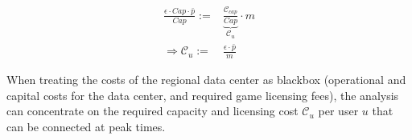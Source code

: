 \begin{align} \label{eq:computational_efficiency}
	\frac{\epsilon \cdot Cap \cdot \bar{p}}{Cap} :=& \underbrace{\frac{\mathcal{C}_{cap}}{Cap}}_{\mathcal{C}_{u}} \cdot m\\
	\Longrightarrow \mathcal{C}_{u} :=& \frac{\epsilon \cdot \bar{p}}{m}
\end{align}

When treating the costs of the regional data center as blackbox (operational and capital costs for the data center, and required game licensing fees), the analysis can concentrate on the required capacity and licensing cost $\mathcal{C}_{u}$ per user $u$ that can be connected at peak times. 








